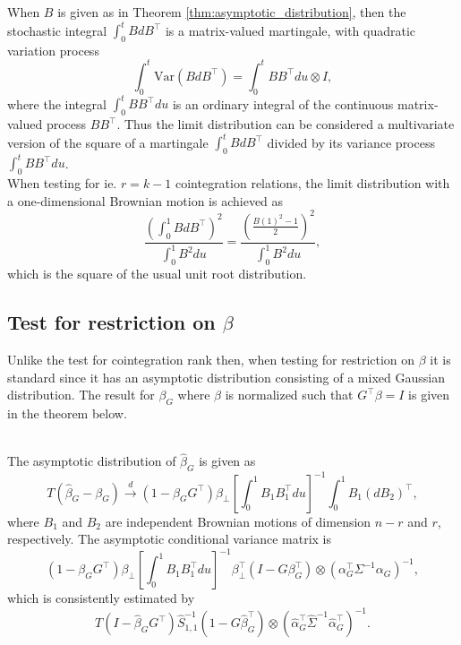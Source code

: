 \noindent When $B$ is given as in Theorem \ref{thm:asymptotic_distribution}, then the stochastic integral $\int_0^t BdB^\top$ is a matrix-valued martingale, with quadratic variation process
\begin{equation*}
    \int_0^t \text{Var}(BdB^\top) =\int_0^t BB^\top du \otimes I,
\end{equation*}
\noindent where the integral $\int_0^t BB^\top du$ is an ordinary integral of the continuous matrix-valued process $BB^\top$. Thus the limit distribution can be considered a multivariate version of the square of a martingale $\int_0^t BdB^\top$ divided by its variance process $\int_0^t BB^\top du$.\\
When testing for ie. $r=k-1$ cointegration relations, the limit distribution with a one-dimensional Brownian motion is achieved as
\begin{equation*}
   \frac{\left(\int_0^1 BdB^\top \right)^2}{\int_0^1 B^2du}=\frac{\left(\frac{B(1)^2-1}{2} \right)^2}{\int_0^1 B^2du},
\end{equation*}
which is the square of the usual unit root distribution.

\subsection{Test for restriction on $\beta$}
Unlike the test for cointegration rank then, when testing for restriction on $\beta$ it is standard since it has an asymptotic distribution consisting of a mixed Gaussian distribution. The result for $\beta_G$ where $\beta$ is normalized such that $G^\top \beta=I$ is given in the theorem below.
\begin{thm}\phantom\\
The asymptotic distribution of $\hat{\beta}_G$ is given as 
\begin{equation}
    T(\hat{\beta}
_G-\beta_G) \overset{d}{\rightarrow} (1-\beta_G G^\top) \beta_\perp \left[ \int_0^1 B_1 B_1^\top du \right]^{-1} \int_0^1 B_1(dB_2)^\top,
    \label{eq:asymptotic_Beta_1}
\end{equation}
    where $B_1$ and $B_2$ are independent Brownian motions of dimension $n-r$ and $r$, respectively. The asymptotic conditional variance matrix is 
    \begin{equation}
        (1-\beta_G G^\top) \beta_\perp \left[\int_0^1 B_1B_1^\top du \right]^{-1} \beta_\perp^\top (I-G\beta_G^\top ) \otimes (\alpha_G^\top \Sigma^{-1}\alpha_G)^{-1},
        \label{eq:asymptotic_Beta_2}
    \end{equation}
    which is consistently estimated by
    \begin{equation}
        T(I-\hat{\beta}_G G^\top)\hat{S}_{1,1}^{-1}(1-G\hat{\beta}_G^\top) \otimes (\hat{\alpha}_G^\top \hat{\Sigma}^{-1}\hat{\alpha}_G^\top)^{-1}.
        \label{eq:asymptotic_Beta_3}
    \end{equation}
\end{thm}

